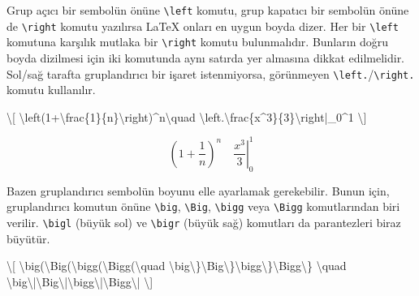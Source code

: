 \documentclass[
  10pt,
]{scrbook}
\newenvironment{Shaded}{}{}
\newcommand{\SpecialCharTok}[1]{\textcolor[rgb]{0.25,0.44,0.63}{#1}}
\newcommand{\SpecialStringTok}[1]{\textcolor[rgb]{0.73,0.40,0.53}{#1}}
\theoremstyle{definition}
\theoremstyle{definition}
\theoremstyle{definition}
\theoremstyle{definition}
\theoremstyle{remark}
\begin{document}
Grup açıcı bir sembolün önüne \texttt{\textbackslash{}left} komutu, grup kapatıcı bir sembolün önüne de \texttt{\textbackslash{}right} komutu yazılırsa LaTeX onları en uygun boyda dizer. Her bir \texttt{\textbackslash{}left} komutuna karşılık mutlaka bir \texttt{\textbackslash{}right} komutu bulunmalıdır. Bunların doğru boyda dizilmesi için iki komutunda aynı satırda yer almasına dikkat edilmelidir. Sol/sağ tarafta gruplandırıcı bir işaret istenmiyorsa, görünmeyen \texttt{\textbackslash{}left.}/\texttt{\textbackslash{}right.} komutu kullanılır.

\begin{Shaded}
\begin{Highlighting}[]
\SpecialStringTok{\textbackslash{}[}
\SpecialCharTok{\textbackslash{}left}\SpecialStringTok{(1+}\SpecialCharTok{\textbackslash{}frac}\SpecialStringTok{\{1\}\{n\}}\SpecialCharTok{\textbackslash{}right}\SpecialStringTok{)\^{}n}\SpecialCharTok{\textbackslash{}quad}
\SpecialCharTok{\textbackslash{}left}\SpecialStringTok{.}\SpecialCharTok{\textbackslash{}frac}\SpecialStringTok{\{x\^{}3\}\{3\}}\SpecialCharTok{\textbackslash{}right}\SpecialStringTok{|\_0\^{}1}
\SpecialStringTok{\textbackslash{}]}
\end{Highlighting}
\end{Shaded}

\[
\left(1+\frac{1}{n}\right)^n\quad
\left.\frac{x^3}{3}\right|_0^1
\]

Bazen gruplandırıcı sembolün boyunu elle ayarlamak gerekebilir. Bunun için, gruplandırıcı komutun önüne \texttt{\textbackslash{}big}, \texttt{\textbackslash{}Big}, \texttt{\textbackslash{}bigg} veya \texttt{\textbackslash{}Bigg} komutlarından biri verilir. \texttt{\textbackslash{}bigl} (büyük sol) ve \texttt{\textbackslash{}bigr} (büyük sağ) komutları da parantezleri biraz büyütür.

\begin{Shaded}
\begin{Highlighting}[]
\SpecialStringTok{\textbackslash{}[}
\SpecialCharTok{\textbackslash{}big}\SpecialStringTok{(}\SpecialCharTok{\textbackslash{}Big}\SpecialStringTok{(}\SpecialCharTok{\textbackslash{}bigg}\SpecialStringTok{(}\SpecialCharTok{\textbackslash{}Bigg}\SpecialStringTok{(}\SpecialCharTok{\textbackslash{}quad}
\SpecialCharTok{\textbackslash{}big\textbackslash{}\}\textbackslash{}Big\textbackslash{}\}\textbackslash{}bigg\textbackslash{}\}\textbackslash{}Bigg\textbackslash{}\}}
\SpecialCharTok{\textbackslash{}quad}
\SpecialCharTok{\textbackslash{}big\textbackslash{}|\textbackslash{}Big\textbackslash{}|\textbackslash{}bigg\textbackslash{}|\textbackslash{}Bigg\textbackslash{}|}
\SpecialStringTok{\textbackslash{}]}
\end{Highlighting}
\end{Shaded}
\end{document}
